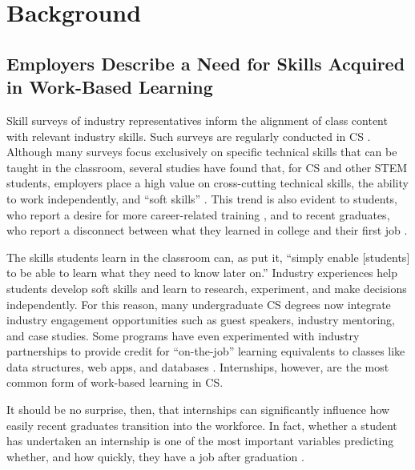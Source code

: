 \section{Background}

\subsection{Employers Describe a Need for Skills Acquired in Work-Based Learning}

Skill surveys of industry representatives inform the alignment of class content with relevant industry skills. Such surveys are regularly conducted in CS \citep[e.g.,][]{yahyaMappingGraduateSkills2024, stepanovaHiringCSGraduates2021, scaffidiEmployersNeedsComputer2018, scaffidiSurveyEmployersNeeds2018}. Although many surveys focus exclusively on specific technical skills that can be taught in the classroom, several studies have found that, for CS and other STEM students, employers place a high value on cross-cutting technical skills, the ability to work independently, and ``soft skills'' \citep{scaffidiSurveyEmployersNeeds2018,raynerEmployerPerspectivesCurrent2015,cheangEmployersExpectationsUniversity2023,menezesWhatSkillsCS2023,humeAreWeDeveloping2024,stalhaneWhatCompetenceSoftware2020}. This trend is also evident to students, who report a desire for more career-related training \citep{gedyeStudentsUndergraduateExpectations2004,craigListeningEarlyCareer2018}, and to recent graduates, who report a disconnect between what they learned in college and their first job \citep{begelStrugglesNewCollege2008,kapoorUnderstandingCSUndergraduate2019}.

The skills students learn in the classroom can, as \citet{beaubouefComputerScienceCurriculum2011} put it, ``simply enable [students] to be able to learn what they need to know later on.'' Industry experiences help students develop soft skills and learn to research, experiment, and make decisions independently. For this reason, many undergraduate CS degrees now integrate industry engagement opportunities such as guest speakers, industry mentoring, and case studies. Some programs have even experimented with industry partnerships to provide credit for ``on-the-job'' learning equivalents to classes like data structures, web apps, and databases \citep{carmichaelCurriculumAlignedWorkIntegratedLearning2018}. Internships, however, are the most common form of work-based learning in CS.

It should be no surprise, then, that internships can significantly influence how easily recent graduates transition into the workforce. In fact, whether a student has undertaken an internship is one of the most important variables predicting whether, and how quickly, they have a job after graduation \citep{callananAssessingRoleInternships2004, saltikoffPositiveImplicationsInternships2017, knouseRelationCollegeInternships1999}.


